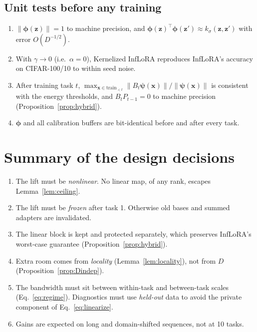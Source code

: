 \documentclass[11pt]{article}
\theoremstyle{plain}
\theoremstyle{definition}
\theoremstyle{remark}
\newcommand{\x}{\bm{x}}
\newcommand{\z}{\bm{z}}
\newcommand{\vphi}{\bm{\phi}}
\newcommand{\vpsi}{\bm{\psi}}
\begin{document}
\subsection{Unit tests before any training}
\begin{enumerate}[nosep]
\item $\|\vphi(\z)\|=1$ to machine precision, and $\vphi(\z)^{\top}\vphi(\z')\approx k_\sigma(\z,\z')$ with error $O(D^{-1/2})$.
\item With $\gamma\to0$ (i.e.\ $\alpha=0$), Kernelized InfLoRA reproduces InfLoRA's accuracy on CIFAR-100/10 to within seed noise.
\item After training task $t$, $\max_{\x\in\text{train}_{<t}}\|B_t\vpsi(\x)\|/\|\vpsi(\x)\|$ is consistent with the energy thresholds, and $B_tP_{t-1}=0$ to machine precision (Proposition~\ref{prop:hybrid}).
\item $\vphi$ and all calibration buffers are bit-identical before and after every task.
\end{enumerate}

\section{Summary of the design decisions}
\begin{enumerate}[nosep]
\item The lift must be \emph{nonlinear}. No linear map, of any rank, escapes Lemma~\ref{lem:ceiling}.
\item The lift must be \emph{frozen} after task 1. Otherwise old bases and summed adapters are invalidated.
\item The linear block is kept and protected separately, which preserves InfLoRA's worst-case guarantee (Proposition~\ref{prop:hybrid}).
\item Extra room comes from \emph{locality} (Lemma~\ref{lem:locality}), not from $D$ (Proposition~\ref{prop:Dindep}).
\item The bandwidth must sit between within-task and between-task scales (Eq.~\eqref{eq:regime}). Diagnostics must use \emph{held-out} data to avoid the private component of Eq.~\eqref{eq:linearize}.
\item Gains are expected on long and domain-shifted sequences, not at 10 tasks.
\end{enumerate}
\end{document}
